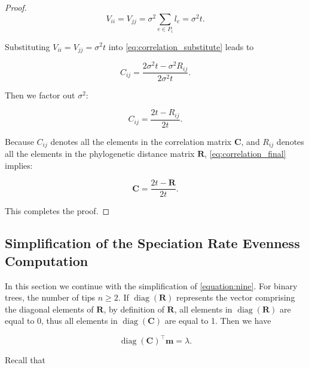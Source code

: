 {\begin{proof}
\begin{equation}
    V_{ii} = V_{jj} = \sigma^2 \sum_{e \in P_i} l_e = \sigma^2 t.
    \label{eq:equal_variances}
\end{equation}

\noindent Substituting \( V_{ii} = V_{jj} = \sigma^2 t \) into \autoref{eq:correlation_substitute} leads to

\begin{equation}
    C_{ij} = \frac{2\sigma^2 t - \sigma^2 R_{ij}}{2\sigma^2 t}.
\end{equation}

\noindent Then we factor out \( \sigma^2 \):

\begin{equation}
    C_{ij} = \frac{2t - R_{ij}}{2t}.
    \label{eq:correlation_final}
\end{equation}

\noindent Because \( C_{ij} \) denotes all the elements in the correlation matrix \( \boldsymbol{C} \), and \( R_{ij} \) denotes all the elements in the phylogenetic distance matrix \( \boldsymbol{R} \), \autoref{eq:correlation_final} implies:

\begin{equation}
    \boxed{\boldsymbol{C} = \frac{2t - \boldsymbol{R}}{2t}}.
\end{equation}

\noindent This completes the proof.
\end{proof}

\clearpage
\subsection{Simplification of the Speciation Rate Evenness Computation}
\label{ch1::sec::appendix::simplify}
In this section we continue with the simplification of \autoref{equation:nine}. For binary trees, the number of tips $n \geq 2$. If $\operatorname{diag}(\boldsymbol{R})$ represents the vector comprising the diagonal elements of $\boldsymbol{R}$, by definition of $\boldsymbol{R}$, all elements in $\operatorname{diag}(\boldsymbol{R})$ are equal to 0, thus all elements in $\operatorname{diag}(\boldsymbol{C})$ are equal to 1. Then we have

\begin{equation}
    \operatorname{diag}(\boldsymbol{C})^{\top}\boldsymbol{m} = \lambda.
\end{equation}

\noindent Recall that 

}
